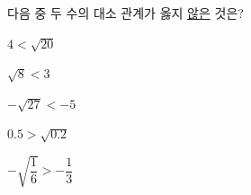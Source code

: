 다음 중 두 수의 대소 관계가 옳지 \underline{않은} 것은?
\begin{choices32}{\rule[-3ex]{0pt}{8ex}$4<\sqrt{20}$}{\rule[-3ex]{0pt}{8ex}$\sqrt{8}<3$}{\rule[-3ex]{0pt}{8ex}$-\sqrt{27}<-5$}{\rule[-3ex]{0pt}{8ex}$0.5>\sqrt{0.2}$}{\rule[-3ex]{0pt}{8ex}$-\sqrt{\dfrac{1}{6}}>-\dfrac{1}{3}$}\end{choices32}
